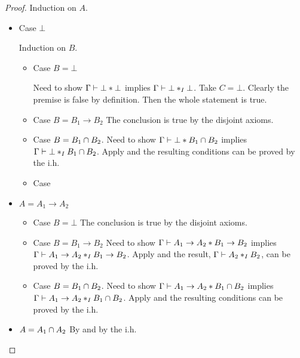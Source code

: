 \begin{proof}
  Induction on $A$.

  \begin{itemize}
    \item Case $\bot$

    Induction on $B$.
      \begin{itemize}
        \item Case $B = \bot$

          Need to show $\Gamma \vdash \bot * \bot$ implies $\Gamma \vdash \bot *_I \bot$. Take $C = \bot$. Clearly the premise is false by definition. Then the whole statement is true. 

        \item Case $B = B_1 \to B_2$
        The conclusion is true by the disjoint axioms.

        \item Case $B = B_1 \cap B_2$.
        Need to show $\Gamma \vdash \bot * B_1 \cap B_2$ implies $\Gamma \vdash \bot *_I B_1 \cap B_2$. Apply  and the resulting conditions can be proved by the i.h.

        \item Case
      \end{itemize}

      \item $A = A_1 \to A_2$
        \begin{itemize}
          \item Case $B = \bot$
          The conclusion is true by the disjoint axioms.

          \item Case $B = B_1 \to B_2$
          Need to show $\Gamma \vdash  A_1 \to A_2 * B_1 \to B_2$ implies $\Gamma \vdash  A_1 \to A_2 *_I B_1 \to B_2$. Apply  and the result, $\Gamma \vdash A_2 *_I B_2$, can be proved by the i.h.

          \item Case $B = B_1 \cap B_2$.
          Need to show $\Gamma \vdash A_1 \to A_2 * B_1 \cap B_2$ implies $\Gamma \vdash A_1 \to A_2 *_I B_1 \cap B_2$. Apply  and the resulting conditions can be proved by the i.h.
        \end{itemize}

        \item $A = A_1 \cap A_2$
        By  and by the i.h.

      \end{itemize}
\end{proof}
